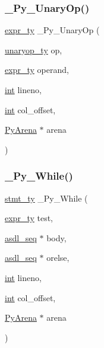 \mbox{\label{_python-ast_8h_a988c2f43347c9e208c14ee54290474ec}} 
\subsubsection{\texorpdfstring{\_Py\_UnaryOp()}{\_Py\_UnaryOp()}}
{\footnotesize\ttfamily \mbox{\hyperlink{_python-ast_8h_a56d3705e020a071405094a220c4592bd}{expr\+\_\+ty}} \+\_\+\+Py\+\_\+\+Unary\+Op (\begin{DoxyParamCaption}\item[{\mbox{\hyperlink{_python-ast_8h_a5a89f44a24bfbdb92d5a16b59468cffb}{unaryop\+\_\+ty}}}]{op,  }\item[{\mbox{\hyperlink{_python-ast_8h_a56d3705e020a071405094a220c4592bd}{expr\+\_\+ty}}}]{operand,  }\item[{\mbox{\hyperlink{warnings_8h_a74f207b5aa4ba51c3a2ad59b219a423b}{int}}}]{lineno,  }\item[{\mbox{\hyperlink{warnings_8h_a74f207b5aa4ba51c3a2ad59b219a423b}{int}}}]{col\+\_\+offset,  }\item[{\mbox{\hyperlink{pyarena_8h_a9edeb357fbb27333471022a0975adb7a}{Py\+Arena}} $\ast$}]{arena }\end{DoxyParamCaption})}

\mbox{\label{_python-ast_8h_a95968d26701a57ae6bb604224b74ecee}} 
\subsubsection{\texorpdfstring{\_Py\_While()}{\_Py\_While()}}
{\footnotesize\ttfamily \mbox{\hyperlink{_python-ast_8h_a39618071027b661bc03e8916e664e1a7}{stmt\+\_\+ty}} \+\_\+\+Py\+\_\+\+While (\begin{DoxyParamCaption}\item[{\mbox{\hyperlink{_python-ast_8h_a56d3705e020a071405094a220c4592bd}{expr\+\_\+ty}}}]{test,  }\item[{\mbox{\hyperlink{structasdl__seq}{asdl\+\_\+seq}} $\ast$}]{body,  }\item[{\mbox{\hyperlink{structasdl__seq}{asdl\+\_\+seq}} $\ast$}]{orelse,  }\item[{\mbox{\hyperlink{warnings_8h_a74f207b5aa4ba51c3a2ad59b219a423b}{int}}}]{lineno,  }\item[{\mbox{\hyperlink{warnings_8h_a74f207b5aa4ba51c3a2ad59b219a423b}{int}}}]{col\+\_\+offset,  }\item[{\mbox{\hyperlink{pyarena_8h_a9edeb357fbb27333471022a0975adb7a}{Py\+Arena}} $\ast$}]{arena }\end{DoxyParamCaption})}

